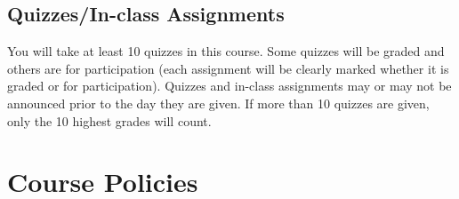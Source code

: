 \documentclass[11pt,]{article}
\begin{document}
\hypertarget{quizzesin-class-assignments}{%
\subsection{Quizzes/In-class
Assignments}\label{quizzesin-class-assignments}}

You will take at least 10 quizzes in this course. Some quizzes will be
graded and others are for participation (each assignment will be clearly
marked whether it is graded or for participation). Quizzes and in-class
assignments may or may not be announced prior to the day they are given.
If more than 10 quizzes are given, only the 10 highest grades will
count.

\hypertarget{course-policies}{%
\section{Course Policies}\label{course-policies}}
\end{document}
